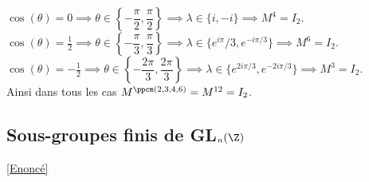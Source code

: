 \documentclass[8pt]{book}
\begin{document}
\begin{enumerate}
		$\cos(\theta)=0\implies \theta\in \left\{-\dfrac{\pi}{2},\dfrac{\pi}{2}\right\}\implies \lambda\in \{i,-i\}\implies M^4=I_2$.\\
		$\cos(\theta)=\displaystyle\frac{1}{2}\implies \theta\in \left\{-\dfrac{\pi}{3},\dfrac{\pi}{3}\right\}\implies \lambda\in \{e^{i\pi}/3,e^{-i\pi/3}\}\implies M^6=I_2$.\\
		$\cos(\theta)=\displaystyle-\frac{1}{2}\implies \theta\in \left\{-\dfrac{2\pi}{3},\dfrac{2\pi}{3}\right\}\implies \lambda\in \{e^{2i\pi/3},e^{-2i\pi/3}\}\implies M^3=I_2$.\\
		Ainsi dans tous les cas $M^{\ppcm(2,3,4,6)}=M^{12}=I_2$.
	\end{enumerate}
	\subsection{Sous-groupes finis de GL$_n(\Z)$}
	\label{Sous-groupes finis de GLn(Z) corrigé}
	\textcolor{blue}{\hyperref[Sous-groupes finis de GLn(Z)]{[Enoncé]}}\\
\end{document}
